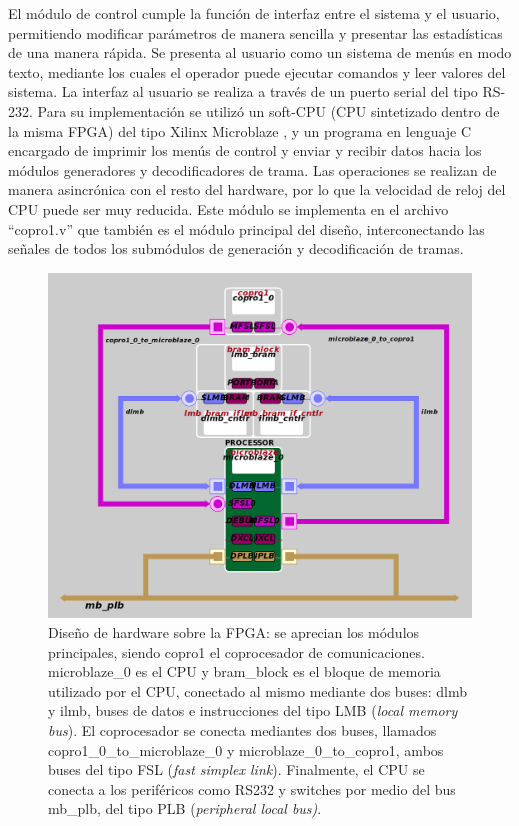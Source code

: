 El módulo de control cumple la función de interfaz entre el sistema y el usuario, permitiendo modificar parámetros de manera sencilla y presentar las estadísticas de una manera rápida. Se presenta al usuario como un sistema de menús en modo texto, mediante los cuales el operador puede ejecutar comandos y leer valores del sistema. La interfaz al usuario se realiza a través de un puerto serial del tipo RS-232. Para su implementación se utilizó un soft-CPU (CPU sintetizado dentro de la misma FPGA) del tipo Xilinx Microblaze \cite{Xilinx:DS865}, y un programa en lenguaje C encargado de imprimir los menús de control y enviar y recibir datos hacia los módulos generadores y decodificadores de trama. Las operaciones se realizan de manera asincrónica con el resto del hardware, por lo que la velocidad de reloj del CPU puede ser muy reducida. Este módulo se implementa en el archivo ``copro1.v'' que también es el módulo principal del diseño, interconectando las señales de todos los submódulos de generación y decodificación de tramas.


\begin{figure}[t]
  \centering
    \includegraphics[width=5.25in]{graphs/diagramaXilinx.png}
\caption {Diseño de hardware sobre la FPGA: se aprecian los módulos principales, siendo copro1 el coprocesador de comunicaciones. microblaze\_0 es el CPU y bram\_block es el bloque de memoria utilizado por el CPU, conectado al mismo mediante dos buses: dlmb y ilmb, buses de datos e instrucciones del tipo LMB (\textit{local memory bus}). El coprocesador se conecta mediantes dos buses, llamados copro1\_0\_to\_microblaze\_0 y microblaze\_0\_to\_copro1, ambos buses del tipo FSL (\textit{fast simplex link}). Finalmente, el CPU se conecta a los periféricos como RS232 y switches por medio del bus mb\_plb, del tipo PLB (\textit{peripheral local bus)}.}
\label{fig:fpgahard}
\end{figure}

